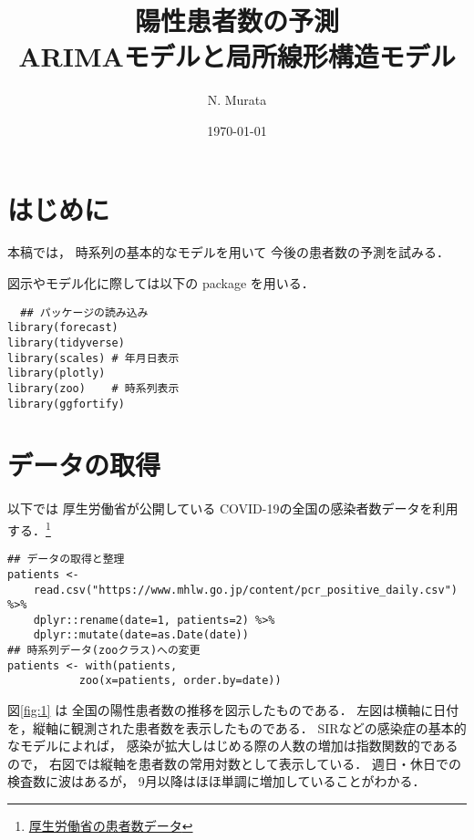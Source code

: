 \documentclass[10pt,oneside,fleqn]{scrartcl}
\author{N. Murata}
\date{\today}
\title{陽性患者数の予測\\\medskip
\large ARIMAモデルと局所線形構造モデル}
\begin{document}
\maketitle
\section{はじめに}
\label{sec:org2393be8}

本稿では，
時系列の基本的なモデルを用いて
今後の患者数の予測を試みる．

図示やモデル化に際しては以下の package を用いる．

\begin{verbatim}
  ## パッケージの読み込み
library(forecast)
library(tidyverse)
library(scales) # 年月日表示
library(plotly) 
library(zoo)    # 時系列表示
library(ggfortify)
\end{verbatim}

\section{データの取得}
\label{sec:orgbefc2ea}

以下では
厚生労働省が公開している
COVID-19の全国の感染者数データを利用する．\footnote{\href{https://www.mhlw.go.jp/content/pcr\_positive\_daily.csv}{厚生労働省の患者数データ}}

\begin{verbatim}
## データの取得と整理 
patients <-
    read.csv("https://www.mhlw.go.jp/content/pcr_positive_daily.csv") %>%
    dplyr::rename(date=1, patients=2) %>% 
    dplyr::mutate(date=as.Date(date))
## 時系列データ(zooクラス)への変更
patients <- with(patients,
		   zoo(x=patients, order.by=date))
\end{verbatim}

図\ref{fig:1} は
全国の陽性患者数の推移を図示したものである．
左図は横軸に日付を，縦軸に観測された患者数を表示したものである．
SIRなどの感染症の基本的なモデルによれば，
感染が拡大しはじめる際の人数の増加は指数関数的であるので，
右図では縦軸を患者数の常用対数として表示している．
週日・休日での検査数に波はあるが，
9月以降はほほ単調に増加していることがわかる．

\begin{figure*}[htbp]
  \centering
\end{figure*}
\end{document}

